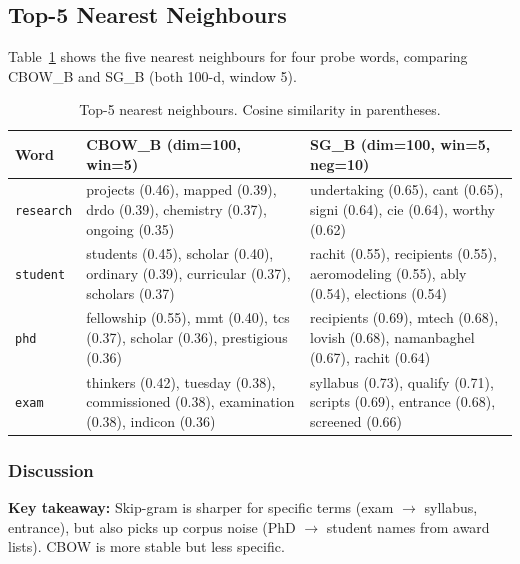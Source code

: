 \documentclass[11pt,a4paper]{article}
\begin{document}
\subsection{Top-5 Nearest Neighbours}

Table~\ref{tab:nn} shows the five nearest neighbours for four probe words, comparing CBOW\_B and SG\_B (both 100-d, window 5).

\begin{table}[H]
\centering
\caption{Top-5 nearest neighbours. Cosine similarity in parentheses.}
\renewcommand{\arraystretch}{1.35}
\small
{}
\begin{tabularx}{\textwidth}{lXX}
\toprule
\textbf{Word} & \textbf{CBOW\_B (dim=100, win=5)} & \textbf{SG\_B (dim=100, win=5, neg=10)} \\
\midrule
\texttt{research}
  & projects (0.46), mapped (0.39), drdo (0.39), chemistry (0.37), ongoing (0.35)
  & undertaking (0.65), cant (0.65), signi (0.64), cie (0.64), worthy (0.62) \\
\addlinespace
\texttt{student}
  & students (0.45), scholar (0.40), ordinary (0.39), curricular (0.37), scholars (0.37)
  & rachit (0.55), recipients (0.55), aeromodeling (0.55), ably (0.54), elections (0.54) \\
\addlinespace
\texttt{phd}
  & fellowship (0.55), mmt (0.40), tcs (0.37), scholar (0.36), prestigious (0.36)
  & recipients (0.69), mtech (0.68), lovish (0.68), namanbaghel (0.67), rachit (0.64) \\
\addlinespace
\texttt{exam}
  & thinkers (0.42), tuesday (0.38), commissioned (0.38), examination (0.38), indicon (0.36)
  & syllabus (0.73), qualify (0.71), scripts (0.69), entrance (0.68), screened (0.66) \\
\bottomrule
\end{tabularx}
\label{tab:nn}
\end{table}

\subsubsection*{Discussion}

\begin{notebox}
\textbf{Key takeaway:} Skip-gram is sharper for specific terms (exam $\to$ syllabus, entrance), but also picks up corpus noise (PhD $\to$ student names from award lists). CBOW is more stable but less specific.
\end{notebox}
\end{document}
